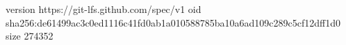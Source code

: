 version https://git-lfs.github.com/spec/v1
oid sha256:de61499ac3c0ed1116c41fd0ab1a010588785ba10a6ad109c289c5cf12dff1d0
size 274352
